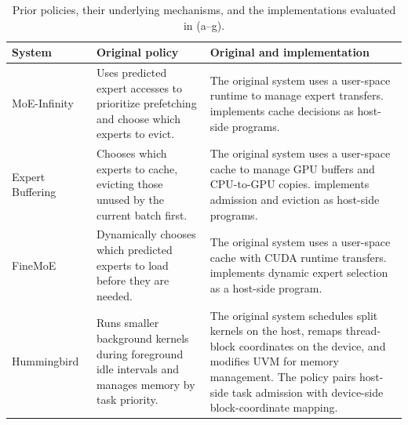 \begin{table}[t]
\centering
\caption{Prior policies, their underlying mechanisms, and the \sys{} implementations evaluated in (a--g).}
\label{tab:published-policies}
\small
\setlength{\tabcolsep}{4pt}
\begin{tabularx}{\textwidth}{@{} >{\hsize=0.5\hsize\raggedright\arraybackslash}X >{\hsize=0.9\hsize\raggedright\arraybackslash}X >{\hsize=1.6\hsize\raggedright\arraybackslash}X @{}}
\toprule
System & Original policy & Original and \sys{} implementation \\
\midrule
MoE-Infinity~\cite{xue2025moeinfinity} & Uses predicted expert accesses to prioritize prefetching and choose which experts to evict. & The original system uses a user-space runtime to manage expert transfers. \sys{} implements cache decisions as host-side programs. \\
\addlinespace
Expert Buffering~\cite{huang2023towards} & Chooses which experts to cache, evicting those unused by the current batch first. & The original system uses a user-space cache to manage GPU buffers and CPU-to-GPU copies. \sys{} implements admission and eviction as host-side programs. \\
\addlinespace
FineMoE~\cite{yu2026finemoe} & Dynamically chooses which predicted experts to load before they are needed. & The original system uses a user-space cache with CUDA runtime transfers. \sys{} implements dynamic expert selection as a host-side program. \\
\addlinespace
Hummingbird~\cite{hu2026hummingbird} & Runs smaller background kernels during foreground idle intervals and manages memory by task priority. & The original system schedules split kernels on the host, remaps thread-block coordinates on the device, and modifies UVM for memory management. The \sys{} policy pairs host-side task admission with device-side block-coordinate mapping. \\

\end{tabularx}
\end{table}
